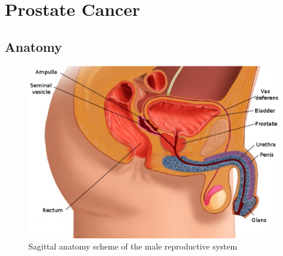 \section{Prostate Cancer}\label{section:intro:prostatecancer}

\subsection{Anatomy}\label{subsection:intro:prostatecancer:anatomy}

\begin{figure}
\centering
\includegraphics[height=0.25\textheight]{1_introduction/figures/anatomy/prostate2D.eps}
\caption{Sagittal anatomy scheme of the male reproductive system}
\label{fig:prostatelocation}
\end{figure}

